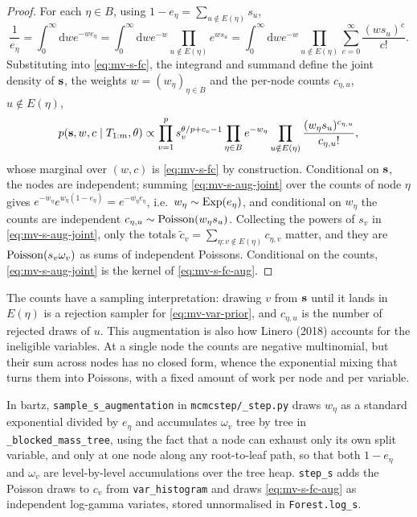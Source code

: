 \begin{proof}
	For each $\eta \in B$, using $1 - e_\eta = \sum_{u \notin E(\eta)} s_u$,
	\begin{equation}
		\frac{1}{e_\eta}
		= \int_0^\infty \mathrm{d}w  e^{-w e_\eta}
		= \int_0^\infty \mathrm{d}w  e^{-w} \prod_{u \notin E(\eta)} e^{w s_u}
		= \int_0^\infty \mathrm{d}w  e^{-w} \prod_{u \notin E(\eta)}
		\sum_{c = 0}^\infty \frac{(w s_u)^c}{c!}.
	\end{equation}
	Substituting into \eqref{eq:mv-s-fc}, the integrand and summand define
	the joint density of $\mathbf{s}$, the weights $w = (w_\eta)_{\eta \in B}$ and
	the per-node counts $c_{\eta,u}$, $u \notin E(\eta)$,
	\begin{equation}
		\label{eq:mv-s-aug-joint}
		p(\mathbf{s}, w, c \mid T_{1:m}, \theta)
		\propto \prod_{v=1}^p s_v^{\theta/p + c_v - 1}
		\prod_{\eta \in B} e^{-w_\eta}
		\prod_{u \notin E(\eta)} \frac{(w_\eta s_u)^{c_{\eta,u}}}{c_{\eta,u}!},
	\end{equation}
	whose marginal over $(w, c)$ is \eqref{eq:mv-s-fc} by construction.
	Conditional on $\mathbf{s}$, the nodes are independent; summing
	\eqref{eq:mv-s-aug-joint} over the counts of node $\eta$ gives
	$e^{-w_\eta} e^{w_\eta (1 - e_\eta)} = e^{-w_\eta e_\eta}$, i.e.\
	$w_\eta \sim \mathrm{Exp}(e_\eta)$, and conditional on $w_\eta$ the counts are
	independent $c_{\eta,u} \sim \mathrm{Poisson}(w_\eta s_u)$. Collecting the powers of
	$s_v$ in \eqref{eq:mv-s-aug-joint}, only the totals
	$\tilde c_v = \sum_{\eta : v \notin E(\eta)} c_{\eta,v}$ matter, and
	they are $\mathrm{Poisson}(s_v \omega_v)$ as sums of independent Poissons. Conditional
	on the counts, \eqref{eq:mv-s-aug-joint} is the kernel of
	\eqref{eq:mv-s-fc-aug}.
\end{proof}

The counts have a sampling interpretation: drawing $v$ from $\mathbf{s}$ until it
lands in $E(\eta)$ is a rejection sampler for \eqref{eq:mv-var-prior}, and
$c_{\eta,u}$ is the number of rejected draws of $u$. This augmentation is
also how Linero (2018) accounts for the ineligible variables. At a single
node the counts are negative multinomial, but their sum across nodes has no
closed form, whence the exponential mixing that turns them into Poissons,
with a fixed amount of work per node and per variable.

In bartz, \texttt{sample\_s\_augmentation} in \texttt{mcmcstep/\_step.py}
draws $w_\eta$ as a standard exponential divided by $e_\eta$ and accumulates
$\omega_v$ tree by tree in \texttt{\_blocked\_mass\_tree}, using the fact
that a node can exhaust only its own split variable, and only at one node
along any root-to-leaf path, so that both $1 - e_\eta$ and $\omega_v$ are
level-by-level accumulations over the tree heap. \texttt{step\_s} adds the Poisson draws to $c_v$ from
\texttt{var\_histogram} and draws \eqref{eq:mv-s-fc-aug} as independent
log-gamma variates, stored unnormalised in \texttt{Forest.log\_s}.

